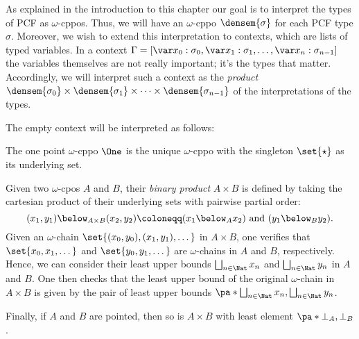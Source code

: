 As explained in the introduction to this chapter our goal is to interpret the
types of PCF as \(\omega\)-cppos. Thus, we will have an \(\omega\)-cppo
\(\densem{\sigma}\) for each PCF type \(\sigma\).
%
Moreover, we wish to extend this interpretation to contexts, which are lists of
typed variables. In a context
\(\Gamma = [\var x_0 : \sigma_0, \var x_1 : \sigma_1 , \dots , \var x_n :
\sigma_{n-1}]\) the variables themselves are not really important; it's the
types that matter. Accordingly, we will interpret such a context as the
\emph{product}
\(\densem{\sigma_0} \times \densem{\sigma_1} \times \cdots \times
\densem{\sigma_{n-1}}\) of the interpretations of the types.

The empty context will be interpreted as follows:

\begin{example}\label{exam:one-point}
  The one point \(\omega\)-cppo \(\One\) is the unique \(\omega\)-cppo with the
  singleton \(\set{\star}\) as its underlying set.
\end{example}

\begin{definition}
  Given two \(\omega\)-cpos \(A\) and \(B\), their \emph{binary product}
  \(A \times B\) is defined by taking the cartesian product of their underlying
  sets with pairwise partial order:
  \[
    (x_1 , y_1) \below_{A \times B} (x_2 , y_2) %
    \coloneqq (x_1 \below_A x_2) \text{ and } (y_1 \below_B y_2).
  \]
  Given an \(\omega\)-chain \(\set{(x_0,y_0),(x_1,y_1),\dots}\) in
  \(A \times B\), one verifies that \(\set{x_0,x_1,\dots}\) and
  \(\set{y_0,y_1,\dots}\) are \(\omega\)-chains in \(A\) and \(B\),
  respectively.
  Hence, we can consider their least upper bounds \(\bigsqcup_{n \in \Nat}x_n\)
  and \(\bigsqcup_{n \in \Nat}y_n\) in \(A\) and \(B\).
  One then checks that the least upper bound of the original \(\omega\)-chain in
  \(A \times B\) is given by the pair of least upper bounds
  \(\pa*{\bigsqcup_{n \in \Nat}x_n , \bigsqcup_{n \in \Nat}y_n}\).

  Finally, if \(A\) and \(B\) are pointed, then so is \(A \times B\) with least
  element \(\pa*{\bot_A , \bot_B}\).
\end{definition}

